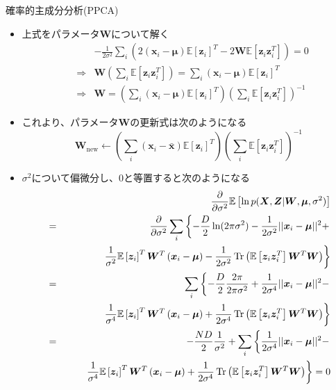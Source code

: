 \documentclass[dvipdfmx,notheorems,t]{beamer}
\begin{document}
\begin{frame}{確率的主成分分析(PPCA)}
\begin{itemize}
\begin{itemize}
		\item 上式をパラメータ$\bm{W}$について解く
		\begin{eqnarray}
			&& -\frac{1}{2 \sigma^2} \sum_i \left( 2 \left( \bm{x}_i - \bm{\mu} \right) \mathbb{E} \left[ \bm{z}_i \right]^T - 2 \bm{W} \mathbb{E} \left[ \bm{z}_i \bm{z}_i^T \right] \right) = 0 \nonumber \\
			&\Rightarrow& \bm{W} \left( \sum_i \mathbb{E} \left[ \bm{z}_i \bm{z}_i^T \right] \right) = \sum_i \left( \bm{x}_i - \bm{\mu} \right) \mathbb{E} \left[ \bm{z}_i \right]^T \nonumber \\
			&\Rightarrow& \bm{W} = \left( \sum_i \left( \bm{x}_i - \bm{\mu} \right) \mathbb{E} \left[ \bm{z}_i \right]^T \right) \left( \sum_i \mathbb{E} \left[ \bm{z}_i \bm{z}_i^T \right] \right)^{-1}
		\end{eqnarray}
		
		\item これより、パラメータ$\bm{W}$の更新式は次のようになる
		\begin{equation}
			\bm{W}_\mathrm{new} \leftarrow \left( \sum_i \left( \bm{x}_i - \bar{\bm{x}} \right) \mathbb{E} \left[ \bm{z}_i \right]^T \right) \left( \sum_i \mathbb{E} \left[ \bm{z}_i \bm{z}_i^T \right] \right)^{-1}
		\end{equation}
		
		\item $\sigma^2$について偏微分し、$0$と等置すると次のようになる
		\begin{eqnarray}
			&& \frac{\partial}{\partial \sigma^2} \mathbb{E} \left[ \ln p(\bm{X}, \bm{Z} | \bm{W}, \bm{\mu}, \sigma^2) \right] \nonumber \\
			&=& \frac{\partial}{\partial \sigma^2} \sum_i \left\{ -\frac{D}{2} \ln (2\pi \sigma^2) - \frac{1}{2 \sigma^2} || \bm{x}_i - \bm{\mu} ||^2 + \right. \nonumber \\
			&& \qquad \left. \frac{1}{\sigma^2} \mathbb{E} \left[ \bm{z}_i \right]^T \bm{W}^T \left( \bm{x}_i - \bm{\mu} \right) - \frac{1}{2 \sigma^2} \operatorname{Tr} \left( \mathbb{E} \left[ \bm{z}_i \bm{z}_i^T \right] \bm{W}^T \bm{W} \right) \right\} \nonumber \\
			&=& \sum_i \left\{ -\frac{D}{2} \frac{2\pi}{2\pi \sigma^2} + \frac{1}{2\sigma^4} || \bm{x}_i - \bm{\mu} ||^2 - \right. \nonumber \\
			&& \qquad \left. \frac{1}{\sigma^4} \mathbb{E} \left[ \bm{z}_i \right]^T \bm{W}^T \left( \bm{x}_i - \bm{\mu} \right) + \frac{1}{2\sigma^4} \operatorname{Tr} \left( \mathbb{E} \left[ \bm{z}_i \bm{z}_i^T \right] \bm{W}^T \bm{W} \right) \right\} \nonumber \\
			&=& -\frac{ND}{2} \frac{1}{\sigma^2} + \sum_i \left\{ \frac{1}{2\sigma^4} || \bm{x}_i - \bm{\mu} ||^2 - \right. \nonumber \\
			&& \qquad \left. \frac{1}{\sigma^4} \mathbb{E} \left[ \bm{z}_i \right]^T \bm{W}^T \left( \bm{x}_i - \bm{\mu} \right) + \frac{1}{2\sigma^4} \operatorname{Tr} \left( \mathbb{E} \left[ \bm{z}_i \bm{z}_i^T \right] \bm{W}^T \bm{W} \right) \right\} = 0 \nonumber
		\end{eqnarray}
		

\end{itemize}
\end{itemize}
\end{frame}
\end{document}
